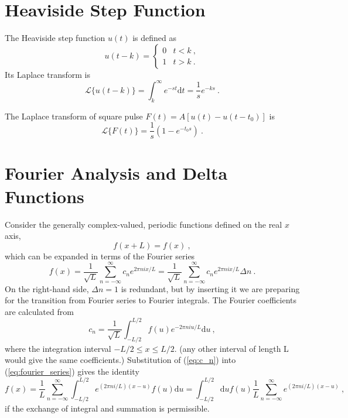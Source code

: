 \documentclass[12pt,a4paper]{article}
\newcommand{\dif}{\mathrm{d}}
\begin{document}
\section{Heaviside Step Function}
\cite{arfken} The Heaviside step function $u(t)$ is defined as
\begin{equation}
u(t -k) = \begin{cases}
0 & t < k ~, \\
1 & t > k ~.
\end{cases}
\end{equation}
Its Laplace transform is
\begin{equation}
\mathcal L \{u(t-k) \} = \int_k^\infty e^{-st} \dif t = \dfrac{1}{s} e^{-ks} ~.
\end{equation}

The Laplace transform of square pulse $F(t) = A [u(t) -u(t-t_0)]$ is
\begin{equation}
\mathcal L \{F(t) \} = \dfrac{1}{s} (1 -e^{-t_0s} ) ~.
\end{equation}

\section{Fourier Analysis and Delta Functions}
\cite{1997qume.book.....M} Consider the generally complex-valued, periodic functions defined on the real $x$ axis,
\begin{equation}
f(x+L) = f(x) ~,
\end{equation}
which can be expanded in terms of the Fourier series
\begin{equation}
f(x) = \dfrac{1}{\sqrt{L}} \sum_{n=-\infty}^\infty c_n e^{2\pi n i x/L} = \dfrac{1}{\sqrt{L}} \sum_{n=-\infty}^\infty c_n e^{2\pi n i x/L} \Delta n ~.
\label{eq:fourier_series}
\end{equation}
On the right-hand side, $\Delta n = 1$ is redundant, but by inserting it we are preparing for the transition from Fourier series to Fourier integrals. The Fourier coefficients are calculated from
\begin{equation}
c_n =  \dfrac{1}{\sqrt{L}} \int_{-L/2}^{L/2} f(u) e^{-2\pi n i u/L} \dif u ~,
\label{eq:c_n}
\end{equation}
where the integration interval $-L/2 \leqslant x \leqslant L/2$. (any other interval of length L would give the same coefficients.) Substitution of (\ref{eq:c_n}) into (\ref{eq:fourier_series}) gives the identity
\begin{equation}
f(x) = \dfrac{1}{L} \sum_{n = -\infty}^\infty \int_{-L/2}^{L/2} e^{(2\pi ni/L)(x-u)} f(u) \dif u = \int_{-L/2}^{L/2} \dif u f(u)  \dfrac{1}{L} \sum_{n = -\infty}^\infty e^{(2\pi ni/L)(x-u)} ~,
\label{eq:identity}
\end{equation}
if the exchange of integral and summation is permissible.
\end{document}
